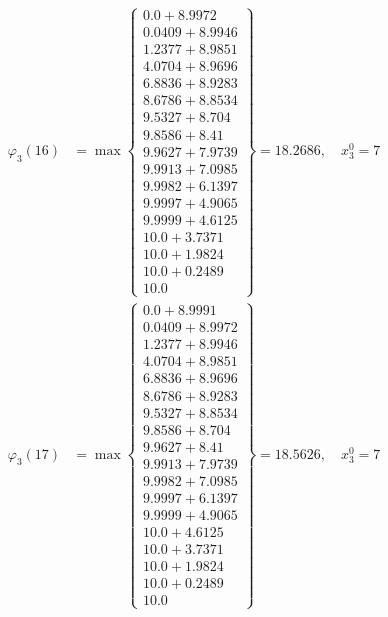 \documentclass{article}
\begin{document}
\begin{align*}
\varphi_{3}(16) &= \max \left\{ \begin{array}{c}
0.0 + 8.9972 \\
 0.0409 + 8.9946 \\
 1.2377 + 8.9851 \\
 4.0704 + 8.9696 \\
 6.8836 + 8.9283 \\
 8.6786 + 8.8534 \\
 9.5327 + 8.704 \\
 9.8586 + 8.41 \\
 9.9627 + 7.9739 \\
 9.9913 + 7.0985 \\
 9.9982 + 6.1397 \\
 9.9997 + 4.9065 \\
 9.9999 + 4.6125 \\
 10.0 + 3.7371 \\
 10.0 + 1.9824 \\
 10.0 + 0.2489 \\
 10.0
\end{array} \right\}=18.2686, \quad x_{3}^0=7\\
  
\varphi_{3}(17) &= \max \left\{ \begin{array}{c}
0.0 + 8.9991 \\
 0.0409 + 8.9972 \\
 1.2377 + 8.9946 \\
 4.0704 + 8.9851 \\
 6.8836 + 8.9696 \\
 8.6786 + 8.9283 \\
 9.5327 + 8.8534 \\
 9.8586 + 8.704 \\
 9.9627 + 8.41 \\
 9.9913 + 7.9739 \\
 9.9982 + 7.0985 \\
 9.9997 + 6.1397 \\
 9.9999 + 4.9065 \\
 10.0 + 4.6125 \\
 10.0 + 3.7371 \\
 10.0 + 1.9824 \\
 10.0 + 0.2489 \\
 10.0
\end{array} \right\}=18.5626, \quad x_{3}^0=7\\
  

\end{align*}
\end{document}
